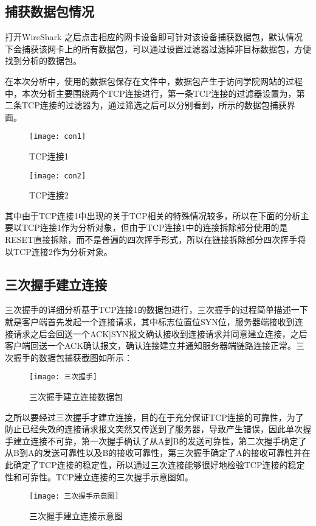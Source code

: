 \documentclass[lang=cn,11pt]{elegantpaper}
\begin{document}
\subsection{捕获数据包情况}


打开WireShark 之后点击相应的网卡设备即可针对该设备捕获数据包，默认情况下会捕获该网卡上的所有数据包，可以通过设置过滤器过滤掉非目标数据包，方便找到分析的数据包。

在本次分析中，使用的数据包保存在文件中，数据包产生于访问学院网站的过程中，本次分析主要围绕两个TCP连接进行，第一条TCP连接的过滤器设置为，第二条TCP连接的过滤器为，通过筛选之后可以分别看到，所示的数据包捕获界面。


\begin{figure}[htbp]
	\centering
	\texttt{[image: con1]}
	\caption{TCP连接1 \label{fig:1}}
\end{figure}
\begin{figure}[htbp]
	\centering
	\texttt{[image: con2]}
	\caption{TCP连接2 \label{fig:2}}
\end{figure}


其中由于TCP连接1中出现的关于TCP相关的特殊情况较多，所以在下面的分析主要以TCP连接1作为分析对象，但由于TCP连接1中的连接拆除部分使用的是RESET直接拆除，而不是普遍的四次挥手形式，所以在链接拆除部分四次挥手将以TCP连接2作为分析对象。

\subsection{三次握手建立连接}
三次握手的详细分析基于TCP连接1的数据包进行，三次握手的过程简单描述一下就是客户端首先发起一个连接请求，其中标志位置位SYN位，服务器端接收到连接请求之后会回送一个ACK|SYN报文确认接收到连接请求并同意建立连接，之后客户端回送一个ACK确认报文，确认连接建立并通知服务器端链路连接正常。三次握手的数据包捕获截图如所示：


\begin{figure}[htbp]
	\centering
	\texttt{[image: 三次握手]}
	\caption{三次握手建立连接数据包\label{fig:3}}
\end{figure}


之所以要经过三次握手才建立连接，目的在于充分保证TCP连接的可靠性，为了防止已经失效的连接请求报文突然又传送到了服务器，导致产生错误，因此单次握手建立连接不可靠，第一次握手确认了从A到B的发送可靠性，第二次握手确定了从B到A的发送可靠性以及B的接收可靠性，第三次握手确定了A的接收可靠性并在此确定了TCP连接的稳定性，所以通过三次连接能够很好地检验TCP连接的稳定性和可靠性。TCP建立连接的三次握手示意图如。
\begin{figure}[htbp]
	\centering
	\texttt{[image: 三次握手示意图]}
	\caption{三次握手建立连接示意图\label{fig:4}}
\end{figure}
\end{document}
